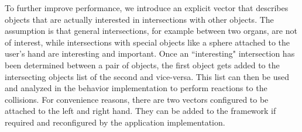 To further improve performance, we introduce an explicit vector that describes objects that are actually interested in intersections with other objects. The assumption is that general intersections, for example between two organs, are not of interest, while intersections with special objects like a sphere attached to the user's hand are interesting and important.
Once an ``interesting" intersection has been determined between a pair of objects, the first object gets added to the intersecting objects list of the second and vice-versa. This list can then be used and analyzed in the behavior implementation to perform reactions to the collisions.
For convenience reasons, there are two vectors configured to be attached to the left and right hand. They can be added to the framework if required and reconfigured by the application implementation.


